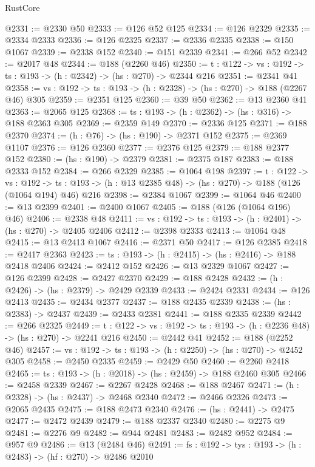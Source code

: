 \begin{lexlean}{RustCore}
\begin{coremodule}
@2331 := @2330 @50
@2333 := @126 @52 @125
@2334 := @126 @2329
@2335 := @2334 @2333
@2336 := @126 @2325
@2337 := @2336 @2335
@2338 := @150 @1067
@2339 := @2338 @152
@2340 := @151 @2339
@2341 := @266 @52
@2342 := @2017 @48
@2344 := @188 (@2260 @46)
@2350 := {t : @122} -> {vs : @192} -> {ts : @193} -> (h : @2342) -> (hs : @270) -> @2344 @216
@2351 := @2341 @41
@2358 := {vs : @192} -> {ts : @193} -> (h : @2328) -> (hs : @270) -> @188 (@2267 @46) @305
@2359 := @2351 @125
@2360 := @39 @50
@2362 := @13 @2360 @41
@2363 := @2065 @125
@2368 := {ts : @193} -> (h : @2362) -> (hs : @316) -> @188 @2363 @305
@2369 := @2359 @149
@2370 := @2336 @125
@2371 := @188 @2370
@2374 := (h : @76) -> (hs : @190) -> @2371 @152
@2375 := @2369 @1107
@2376 := @126 @2360
@2377 := @2376 @125
@2379 := @188 @2377 @152
@2380 := (hs : @190) -> @2379
@2381 := @2375 @187
@2383 := @188 @2333 @152
@2384 := @266 @2329
@2385 := @1064 @198
@2397 := {t : @122} ->
  {vs : @192} ->
  {ts : @193} -> (h : @13 @2385 @48) -> (hs : @270) -> @188 (@126 (@1064 @194) @46) @216
@2398 := @2384 @1067
@2399 := @1064 @46
@2400 := @13 @2399
@2401 := @2400 @1067
@2405 := @188 (@126 (@1064 @196) @46)
@2406 := @2338 @48
@2411 := {vs : @192} -> {ts : @193} -> (h : @2401) -> (hs : @270) -> @2405 @2406
@2412 := @2398 @2333
@2413 := @1064 @48
@2415 := @13 @2413 @1067
@2416 := @2371 @50
@2417 := @126 @2385
@2418 := @2417 @2363
@2423 := {ts : @193} -> (h : @2415) -> (hs : @2416) -> @188 @2418 @2406
@2424 := @2412 @152
@2426 := @13 @2329 @1067
@2427 := @126 @2399
@2428 := @2427 @2370
@2429 := @188 @2428
@2432 := (h : @2426) -> (hs : @2379) -> @2429 @2339
@2433 := @2424 @2331
@2434 := @126 @2413
@2435 := @2434 @2377
@2437 := @188 @2435 @2339
@2438 := (hs : @2383) -> @2437
@2439 := @2433 @2381
@2441 := @188 @2335 @2339
@2442 := @266 @2325
@2449 := {t : @122} -> {vs : @192} -> {ts : @193} -> (h : @2236 @48) -> (hs : @270) -> @2241 @216
@2450 := @2442 @41
@2452 := @188 (@2252 @46)
@2457 := {vs : @192} -> {ts : @193} -> (h : @2250) -> (hs : @270) -> @2452 @305
@2458 := @2450 @2335
@2459 := @2429 @50
@2460 := @2260 @2418
@2465 := {ts : @193} -> (h : @2018) -> (hs : @2459) -> @188 @2460 @305
@2466 := @2458 @2339
@2467 := @2267 @2428
@2468 := @188 @2467
@2471 := (h : @2328) -> (hs : @2437) -> @2468 @2340
@2472 := @2466 @2326
@2473 := @2065 @2435
@2475 := @188 @2473 @2340
@2476 := (hs : @2441) -> @2475
@2477 := @2472 @2439
@2479 := @188 @2337 @2340
@2480 := @2275 @9
@2481 := @2276 @9
@2482 := @944 @2481
@2483 := @2482 @952
@2484 := @957 @9
@2486 := @13 (@2484 @46)
@2491 := {fs : @192} -> {tys : @193} -> (h : @2483) -> (hf : @270) -> @2486 @2010

\end{coremodule}
\end{lexlean}
